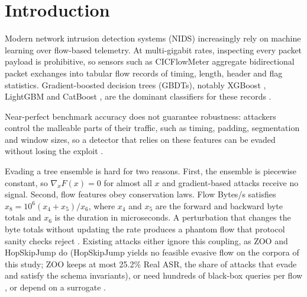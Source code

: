 \section{Introduction}
\label{sec:intro}

Modern network intrusion detection systems (NIDS) increasingly rely on machine learning over flow-based telemetry. At multi-gigabit rates, inspecting every packet payload is prohibitive, so sensors such as CICFlowMeter \cite{sharafaldin2018toward} aggregate bidirectional packet exchanges into tabular flow records of timing, length, header and flag statistics. Gradient-boosted decision trees (GBDTs), notably XGBoost \cite{chen2016xgboost}, LightGBM \cite{ke2017lightgbm} and CatBoost \cite{prokhorenkova2018catboost}, are the dominant classifiers for these records \cite{dang2022using, dang2022studying}.

Near-perfect benchmark accuracy does not guarantee robustness: attackers control the malleable parts of their traffic, such as timing, padding, segmentation and window sizes, so a detector that relies on these features can be evaded without losing the exploit \cite{apruzzese2022modeling, sommer2010outside, geirhos2020shortcut}.

Evading a tree ensemble is hard for two reasons. First, the ensemble is piecewise constant, so $\nabla_x F(x)=0$ for almost all $x$ and gradient-based attacks receive no signal. Second, flow features obey conservation laws. Flow Bytes/s satisfies $x_8 = 10^6(x_4+x_5)/x_6$, where $x_4$ and $x_5$ are the forward and backward byte totals and $x_6$ is the duration in microseconds. A perturbation that changes the byte totals without updating the rate produces a phantom flow that protocol sanity checks reject \cite{pierazzi2020intrusion, apruzzese2022modeling}. Existing attacks either ignore this coupling, as ZOO \cite{chen2017zoo} and HopSkipJump \cite{chen2020hopskipjump} do (HopSkipJump yields no feasible evasive flow on the corpora of this study; ZOO keeps at most 25.2\% Real ASR, the share of attacks that evade and satisfy the schema invariants), or need hundreds of black-box queries per flow \cite{simonetto2024constrained, ghamizi2020moeva, han2021traffic}, or depend on a surrogate \cite{simonetto2024constrained, zolbayar2022nidsgan}.

